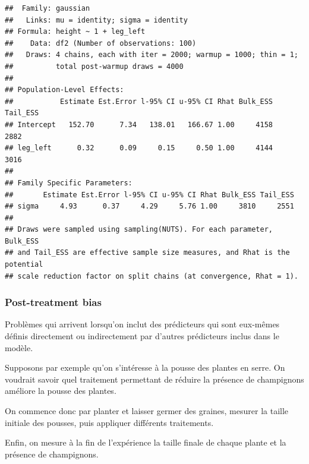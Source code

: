 \documentclass[
  a4paper,11pt,twoside,onecolumn,openright,final,oldfontcommands]{memoir}
\theoremstyle{definition}
\theoremstyle{definition}
\theoremstyle{definition}
\theoremstyle{definition}
\theoremstyle{remark}
\begin{document}
\begin{verbatim}
##  Family: gaussian 
##   Links: mu = identity; sigma = identity 
## Formula: height ~ 1 + leg_left 
##    Data: df2 (Number of observations: 100) 
##   Draws: 4 chains, each with iter = 2000; warmup = 1000; thin = 1;
##          total post-warmup draws = 4000
## 
## Population-Level Effects: 
##           Estimate Est.Error l-95% CI u-95% CI Rhat Bulk_ESS Tail_ESS
## Intercept   152.70      7.34   138.01   166.67 1.00     4158     2882
## leg_left      0.32      0.09     0.15     0.50 1.00     4144     3016
## 
## Family Specific Parameters: 
##       Estimate Est.Error l-95% CI u-95% CI Rhat Bulk_ESS Tail_ESS
## sigma     4.93      0.37     4.29     5.76 1.00     3810     2551
## 
## Draws were sampled using sampling(NUTS). For each parameter, Bulk_ESS
## and Tail_ESS are effective sample size measures, and Rhat is the potential
## scale reduction factor on split chains (at convergence, Rhat = 1).
\end{verbatim}

\hypertarget{post-treatment-bias}{%
\subsubsection{Post-treatment bias}\label{post-treatment-bias}}

Problèmes qui arrivent lorsqu'on inclut des prédicteurs qui sont eux-mêmes définis directement ou indirectement par d'autres prédicteurs inclus dans le modèle.

Supposons par exemple qu'on s'intéresse à la pousse des plantes en serre. On voudrait savoir quel traitement permettant de réduire la présence de champignons améliore la pousse des plantes.

On commence donc par planter et laisser germer des graines, mesurer la taille initiale des pousses, puis appliquer différents traitements.

Enfin, on mesure à la fin de l'expérience la taille finale de chaque plante et la présence de champignons.
\end{document}
